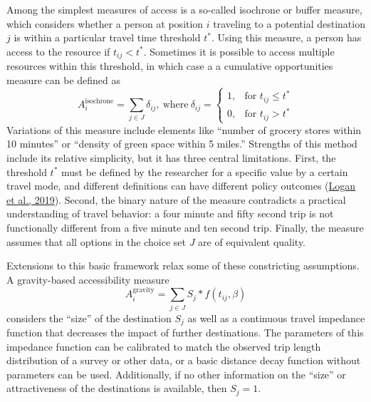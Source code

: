 \documentclass[review, 3p]{elsarticle} %
\begin{document}
Among the simplest measures of access is a so-called isochrone or buffer measure, which
considers whether a person at position \(i\) traveling to a potential destination
\(j\) is within a particular travel time threshold \(t^*\). Using this measure, a
person has access to the resource if \(t_{ij} < t^*\). Sometimes it is
possible to access multiple resources within this threshold, in which case a
a cumulative opportunities measure can be defined as
\begin{equation}
  A_i^{\mathrm{isochrone}} = \sum_{j \in J} \delta_{ij}, 
  \mathrm{\ where\ } \delta_{ij} = 
  \begin{cases}
    1, & \text{for } t_{ij} \leq t^*\\
    0, & \text{for } t_{ij} > t^*
  \end{cases} 
  \label{eq:isochrone}
\end{equation}
Variations of this measure include elements like ``number of grocery stores
within 10 minutes'' or ``density of green space within 5 miles.'' Strengths of
this method include its relative simplicity, but it has three central limitations. First,
the threshold \(t^*\) must be defined by the researcher for a specific value by
a certain travel mode, and different definitions
can have different policy outcomes (\protect\hyperlink{ref-logan2019}{Logan et al., 2019}). Second, the binary nature of the
measure contradicts a practical understanding of travel behavior: a four minute and fifty second
trip is not functionally different from a five minute and ten second trip. Finally,
the measure assumes that all options in the choice set \(J\) are of equivalent
quality.

Extensions to this basic framework relax some of these constricting assumptions.
A gravity-based accessibility measure
\begin{equation}
  A_i^{\mathrm{gravity}} = \sum_{j \in J} S_j * f(t_{ij}, \beta)
  \label{eq:gravity}
\end{equation}
considers the ``size'' of the destination \(S_j\) as well as a continuous travel
impedance function that decreases the impact of further destinations. The parameters
of this impedance function can be calibrated to match the observed trip length
distribution of a survey or other data, or a basic distance decay function without
parameters can be used. Additionally, if no other information on the ``size'' or
attractiveness of the destinations is available, then \(S_j = 1\).
\end{document}
